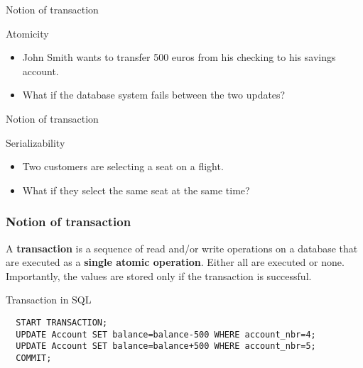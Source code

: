 \documentclass[xcolor=table]{beamer}
\begin{document}
  \begin{frame}{Notion of transaction}
    \begin{exampleblock}{Atomicity}
      \footnotesize
      \begin{itemize}
        \item John Smith wants to transfer 500 euros from his checking to his 
        savings account.
        \item What if the database system fails between the two updates?
      \end{itemize}
    \end{exampleblock}
    \begin{center}
    \end{center}
  \end{frame}

  \begin{frame}{Notion of transaction}
    \begin{exampleblock}{Serializability}
      \footnotesize
      \begin{itemize}
        \item Two customers are selecting a seat on a flight.
        \item What if they select the same seat at the same time?
      \end{itemize}
    \end{exampleblock}
    \vfill
    \begin{center}
    \end{center}
  \end{frame}
  
  \begin{frame}[fragile]
  \frametitle{Notion of transaction}
  \begin{definition}[Transaction]
  A \textbf{transaction} is a sequence of read and/or write operations 
  on a database that are executed as a \textbf{single atomic operation}.
  Either all are executed or none. Importantly, 
  the values are stored only if the transaction is successful. 
  \end{definition}
  \vfill
  \begin{exampleblock}{Transaction in SQL}
  \footnotesize
  \begin{verbatim}
  START TRANSACTION;
  UPDATE Account SET balance=balance-500 WHERE account_nbr=4;
  UPDATE Account SET balance=balance+500 WHERE account_nbr=5;
  COMMIT; 
  \end{verbatim}
  \end{exampleblock}
  \end{frame}
  
\end{document}
